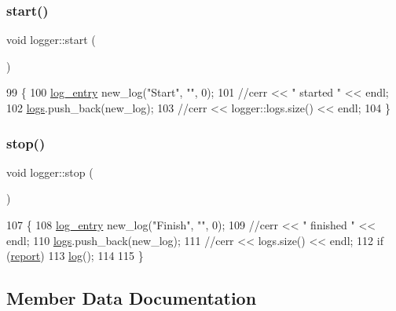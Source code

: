\subsubsection{\texorpdfstring{start()}{start()}}
{\footnotesize\ttfamily void logger\+::start (\begin{DoxyParamCaption}{ }\end{DoxyParamCaption})\hspace{0.3cm}{\ttfamily [static]}}


\begin{DoxyCode}
99                   \{
100   \hyperlink{classlog__entry}{log\_entry} new\_log(\textcolor{stringliteral}{"Start"}, \textcolor{stringliteral}{""}, 0);
101   \textcolor{comment}{//cerr << " started " << endl;}
102   \hyperlink{classlogger_a46e89697a97bc41a90ec78763bfe4d39}{logs}.push\_back(new\_log);
103   \textcolor{comment}{//cerr << logger::logs.size() << endl;}
104 \}
\end{DoxyCode}
\mbox{\label{classlogger_abb856642f4e62c7a4a11cc4a2d963010}} 
\subsubsection{\texorpdfstring{stop()}{stop()}}
{\footnotesize\ttfamily void logger\+::stop (\begin{DoxyParamCaption}{ }\end{DoxyParamCaption})\hspace{0.3cm}{\ttfamily [static]}}


\begin{DoxyCode}
107                  \{
108   \hyperlink{classlog__entry}{log\_entry} new\_log(\textcolor{stringliteral}{"Finish"}, \textcolor{stringliteral}{""}, 0);
109   \textcolor{comment}{//cerr << " finished " << endl;}
110   \hyperlink{classlogger_a46e89697a97bc41a90ec78763bfe4d39}{logs}.push\_back(new\_log);
111   \textcolor{comment}{//cerr << logs.size() << endl;}
112   \textcolor{keywordflow}{if} (\hyperlink{classlogger_adbcc380b0ef53e23125f91e1c8f13f4e}{report})
113     \hyperlink{classlogger_ab518e6d927694bb7329e933fa75c27bf}{log}();
114 
115 \}
\end{DoxyCode}


\subsection{Member Data Documentation}
\mbox{\label{classlogger_a9d29b49bd318a719a8e85b59eac54fe0}} 
